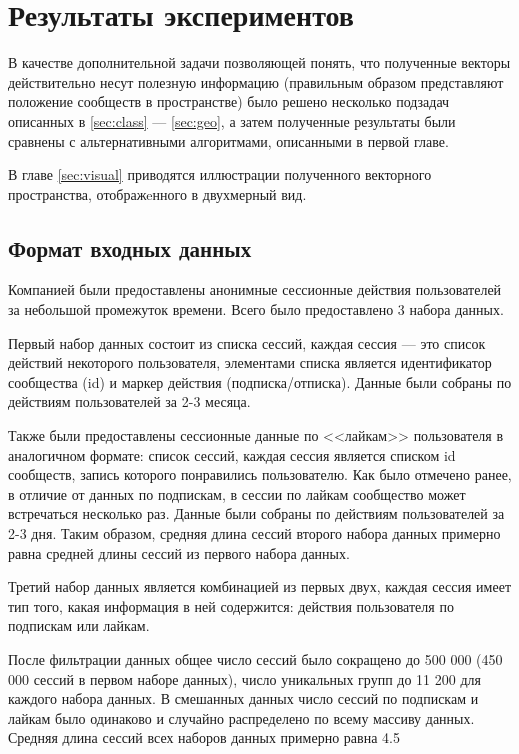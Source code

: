 \documentclass[times,specification,annotation]{itmo-student-thesis}
\begin{document}
\chapter{Результаты экспериментов}\label{experiments}

В качестве дополнительной задачи позволяющей понять, что полученные
векторы действительно несут полезную информацию (правильным образом
представляют положение сообществ в пространстве) было решено несколько подзадач
описанных в \ref{sec:class} --- \ref{sec:geo}, а затем полученные результаты были сравнены с альтернативными
алгоритмами, описанными в первой главе. 

В главе \ref{sec:visual} приводятся иллюстрации полученного векторного пространства, отображeнного в двухмерный вид.

\section{Формат входных данных}\label{sec:data-format}

Компанией были предоставлены анонимные сессионные действия пользователей за небольшой промежуток времени. Всего было предоставлено 3 набора данных.

Первый набор данных состоит из списка сессий, каждая сессия --- это список действий некоторого пользователя, элементами списка является идентификатор сообщества (id) и маркер действия (подписка/отписка). Данные были собраны по действиям пользователей за 2-3 месяца.

Также были предоставлены сессионные данные по <<лайкам>> пользователя в аналогичном формате: список сессий, каждая сессия является списком id сообществ, запись которого понравились пользователю. Как было отмечено ранее, в отличие от данных по подпискам, в сессии по лайкам сообщество может встречаться несколько раз. Данные были собраны по действиям пользователей за 2-3 дня. Таким образом, средняя длина сессий второго набора данных примерно равна средней длины сессий из первого набора данных. 

Третий набор данных является комбинацией из первых двух, каждая сессия имеет тип того, какая информация в ней содержится: действия пользователя по подпискам или лайкам. 

После фильтрации данных общее число сессий было сокращено до 500 000 (450 000 сессий в первом наборе данных), число уникальных групп до 11 200 для каждого набора данных. В смешанных данных число сессий по подпискам и лайкам было одинаково и случайно распределено по всему массиву данных. Средняя длина сессий всех наборов данных примерно равна 4.5
\end{document}
